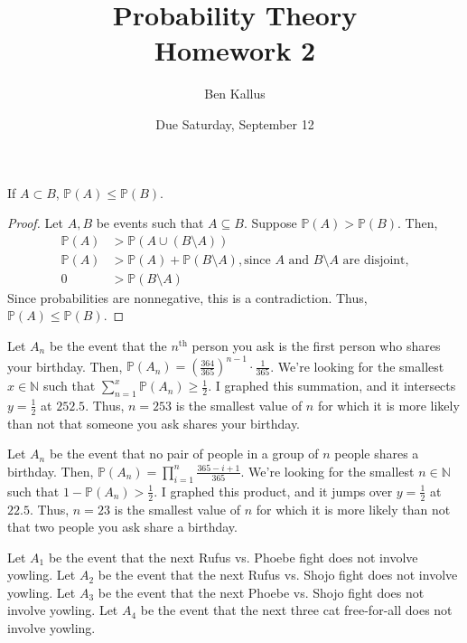 \documentclass[12pt]{article}
\title{Probability Theory \\ Homework 2}
\author{Ben Kallus}
\date{Due Saturday, September 12}
\begin{document}
\maketitle

 If $A \subset B$, $\mathbb P(A) \leq \mathbb P(B)$.
\begin{proof}
    Let $A, B$ be events such that $A \subseteq B$. Suppose $\mathbb P(A) > \mathbb P(B)$. Then,
    \begin{align*}
        \mathbb P(A) &> \mathbb P(A \cup (B \setminus A)) \\
        \mathbb P(A) &> \mathbb P(A) + \mathbb P(B \setminus A), \text{since $A$ and $B \setminus A$ are disjoint,} \\
        0            &> \mathbb P(B \setminus A)
    \end{align*}
    Since probabilities are nonnegative, this is a contradiction. Thus, $\mathbb P(A) \leq \mathbb P(B)$.
\end{proof}

\newpage
{}


    Let $A_n$ be the event that the $n^\text{th}$ person you ask is the first person who shares your birthday. Then, $\mathbb P(A_n) = (\frac{364}{365})^{n-1} \cdot \frac{1}{365}$. We're looking for the smallest $x \in \mathbb N$ such that $\sum_{n=1}^x \mathbb P(A_n) \geq \frac12$. I graphed this summation, and it intersects $y=\frac12$ at $252.5$. Thus, $n=253$ is the smallest value of $n$ for which it is more likely than not that someone you ask shares your birthday.

\medskip
{}

    Let $A_n$ be the event that no pair of people in a group of $n$ people shares a birthday. Then, $\mathbb P(A_n) = \prod_{i=1}^n \frac{365 - i + 1}{365}$. We're looking for the smallest $n \in \mathbb N$ such that $1 - \mathbb P(A_n) > \frac12$. I graphed this product, and it jumps over $y=\frac12$ at $22.5$. Thus, $n=23$ is the smallest value of $n$ for which it is more likely than not that two people you ask share a birthday.
    
\newpage
{}


    Let $A_1$ be the event that the next Rufus vs. Phoebe fight does not involve yowling.
    Let $A_2$ be the event that the next Rufus vs. Shojo fight does not involve yowling.
    Let $A_3$ be the event that the next Phoebe vs. Shojo fight does not involve yowling.
    Let $A_4$ be the event that the next three cat free-for-all does not involve yowling.
    
\end{document}
